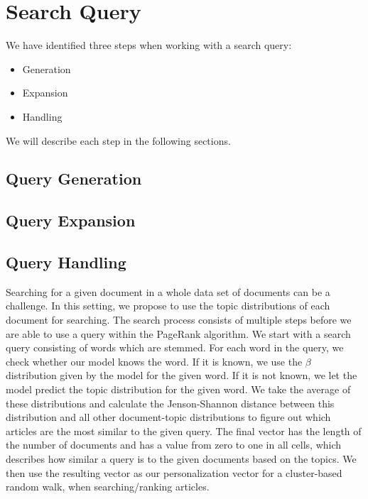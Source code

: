 \section{Search Query}
We have identified three steps when working with a search query:
\begin{itemize}
	\item Generation
	\item Expansion
	\item Handling
\end{itemize}

We will describe each step in the following sections.


\subsection{Query Generation}


\subsection{Query Expansion}


\subsection{Query Handling}
Searching for a given document in a whole data set of documents can be a challenge. 
In this setting, we propose to use the topic distributions of each document for searching.
The search process consists of multiple steps before we are able to use a query within the PageRank algorithm. 
We start with a search query consisting of words which are stemmed.
For each word in the query, we check whether our model knows the word.
If it is known, we use the $\beta$ distribution given by the model for the given word. 
If it is not known, we let the model predict the topic distribution for the given word.
We take the average of these distributions and calculate the Jenson-Shannon distance between this distribution and all other document-topic distributions to figure out which articles are the most similar to the given query.
The final vector has the length of the number of documents and has a value from zero to one in all cells, which describes how similar a query is to the given documents based on the topics.
We then use the resulting vector as our personalization vector for a cluster-based random walk, when searching/ranking articles.
 
